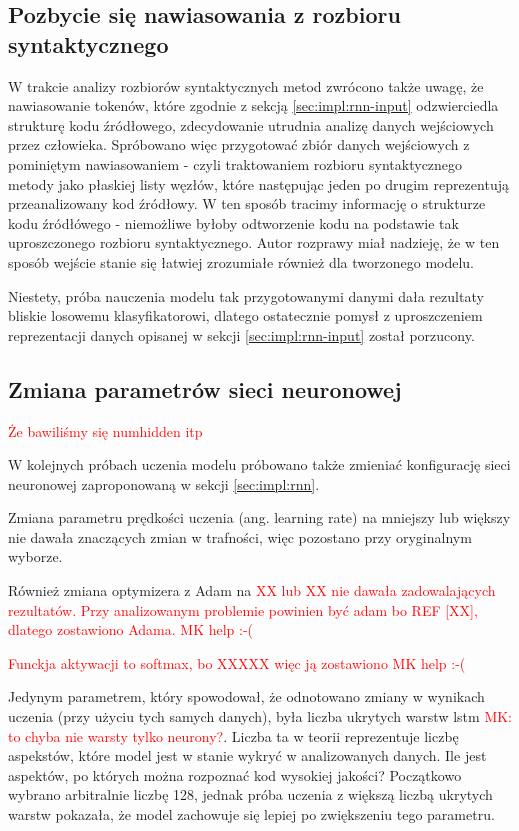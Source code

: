 \documentclass[12pt]{report}
\begin{document}
\subsection{Pozbycie się nawiasowania z rozbioru syntaktycznego}

W trakcie analizy rozbiorów syntaktycznych metod zwrócono także uwagę, że nawiasowanie tokenów, które zgodnie z sekcją \ref{sec:impl:rnn-input} odzwierciedla strukturę kodu źródłowego, zdecydowanie utrudnia analizę danych wejściowych przez człowieka. Spróbowano więc przygotować zbiór danych wejściowych z pominiętym nawiasowaniem - czyli traktowaniem rozbioru syntaktycznego metody jako płaskiej listy węzłów, które następując jeden po drugim reprezentują przeanalizowany kod źródłowy. W ten sposób tracimy informację o strukturze kodu źródłówego - niemożliwe byłoby odtworzenie kodu na podstawie tak uproszczonego rozbioru syntaktycznego. Autor rozprawy miał nadzieję, że w ten sposób wejście stanie się łatwiej zrozumiałe również dla tworzonego modelu.

Niestety, próba nauczenia modelu tak przygotowanymi danymi dała rezultaty bliskie losowemu klasyfikatorowi, dlatego ostatecznie pomysł z uproszczeniem reprezentacji danych opisanej w sekcji \ref{sec:impl:rnn-input} został porzucony.

\subsection{Zmiana parametrów sieci neuronowej}
\textcolor{red}{Że bawiliśmy się numhidden itp}

W kolejnych próbach uczenia modelu próbowano także zmieniać konfigurację sieci neuronowej zaproponowaną w sekcji \ref{sec:impl:rnn}.

Zmiana parametru prędkości uczenia (ang. learning rate) na mniejszy lub większy nie dawała znaczących zmian w trafności, więc pozostano przy oryginalnym wyborze.

Również zmiana optymizera z Adam na \textcolor{red}{XX lub XX nie dawała zadowalających rezultatów. Przy analizowanym problemie powinien być adam bo REF [XX], dlatego zostawiono Adama. MK help :-(}

\textcolor{red}{Funckja aktywacji to softmax, bo XXXXX więc ją zostawiono MK help :-(}

Jedynym parametrem, który spowodował, że odnotowano zmiany w wynikach uczenia (przy użyciu tych samych danych), była liczba ukrytych warstw \gls{lstm} \textcolor{red}{MK: to chyba nie warsty tylko neurony?}. Liczba ta w teorii reprezentuje liczbę aspekstów, które model jest w stanie wykryć w analizowanych danych. Ile jest aspektów, po których można rozpoznać kod wysokiej jakości? Początkowo wybrano arbitralnie liczbę 128, jednak próba uczenia z większą liczbą ukrytych warstw pokazała, że model zachowuje się lepiej po zwiększeniu tego parametru.
\end{document}
